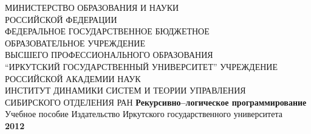 \documentclass[12pt, openany, twoside]{book} %
\begin{document}
\def\chaptername{Тема}
\def\thechapter{\Roman{chapter}}
\def\thefigure{\arabic{section}.\arabic{figure}}
\def\thetable{\arabic{section}.\arabic{table}}
\fancyhf{} %
\fancyhead[RE]{\slshape \leftmark}
\fancyhead[LO]{\slshape \rightmark}
\fancyhead[RO,LE]{\slshape \thepage}
\renewcommand{\headrulewidth}{1pt}
\renewcommand{\footrulewidth}{0pt}%
\pagestyle{fancy}
\begin{titlepage}
\thispagestyle{empty}
\begin{center}{\sc
МИНИСТЕРСТВО ОБРАЗОВАНИЯ И НАУКИ \\
РОССИЙСКОЙ ФЕДЕРАЦИИ \\
ФЕДЕРАЛЬНОЕ ГОСУДАРСТВЕННОЕ БЮДЖЕТНОЕ \\
ОБРАЗОВАТЕЛЬНОЕ УЧРЕЖДЕНИЕ \\
ВЫСШЕГО ПРОФЕССИОНАЛЬНОГО ОБРАЗОВАНИЯ\\
``ИРКУТСКИЙ ГОСУДАРСТВЕННЫЙ УНИВЕРСИТЕТ''
    УЧРЕЖДЕНИЕ РОССИЙСКОЙ АКАДЕМИИ НАУК \\
ИНСТИТУТ ДИНАМИКИ СИСТЕМ И ТЕОРИИ УПРАВЛЕНИЯ \\
СИБИРСКОГО ОТДЕЛЕНИЯ РАН
}
 \vfill
{\large\bf Рекурсивно--логическое программирование}\\
{Учебное пособие}
\vfill
\vfill
 Издательство Иркутского государственного университета\\
 {\bf 2012}
\end{center}
\end{titlepage}
\end{document}
